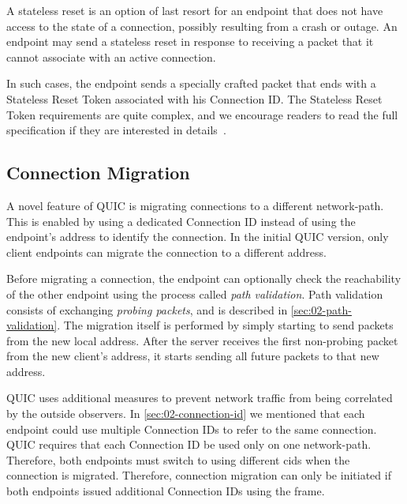 A stateless reset is an option of last resort for an endpoint that does not have access to the state
of a connection, possibly resulting from a crash or outage. An endpoint may send a stateless reset
in response to receiving a packet that it cannot associate with an active connection.

In such cases, the endpoint sends a specially crafted packet that ends with a Stateless Reset Token
associated with his Connection ID\@. The Stateless Reset Token requirements are quite complex, and
we encourage readers to read the full specification if they are interested in
details~\autocite[Section~10.4]{draft-ietf-quic-transport}.

\subsection{Connection Migration}

A novel feature of QUIC is migrating connections to a different \gls{network-path}. This is enabled
by using a dedicated Connection ID instead of using the endpoint's address to identify the
connection. In the initial QUIC version, only client endpoints can migrate the connection to a
different address.

Before migrating a connection, the endpoint can optionally check the reachability of the other
endpoint using the process called \textit{path validation}. Path validation consists of exchanging
\textit{probing packets}, and is described in \autoref{sec:02-path-validation}. The migration itself
is performed by simply starting to send packets from the new local address. After the server
receives the first non-probing packet from the new client's address, it starts sending all future
packets to that new address.

QUIC uses additional measures to prevent network traffic from being correlated by the outside
observers. In \autoref{sec:02-connection-id} we mentioned that each endpoint could use multiple
Connection IDs to refer to the same connection. QUIC requires that each Connection ID be used only
on one \gls{network-path}. Therefore, both endpoints must switch to using different \glspl{cid} when
the connection is migrated. Therefore, connection migration can only be initiated if both endpoints
issued additional Connection IDs using the \NEWCONNECTIONID{} frame.

